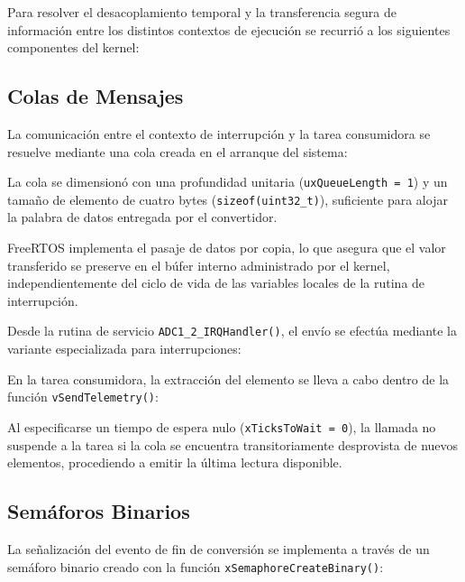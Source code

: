 Para resolver el desacoplamiento temporal y la transferencia segura de información entre los distintos contextos de
ejecución se recurrió a los siguientes componentes del kernel:

\subsection{Colas de Mensajes}

La comunicación entre el contexto de interrupción y la tarea consumidora se resuelve mediante una cola 
creada en el arranque del sistema:



La cola se dimensionó con una profundidad unitaria (\texttt{uxQueueLength = 1}) y un tamaño de elemento de cuatro bytes
(\texttt{sizeof(uint32\_t)}), suficiente para alojar la palabra de datos entregada por el convertidor.

FreeRTOS implementa el pasaje de datos por copia, lo que asegura que el valor transferido
se preserve en el búfer interno administrado por el kernel, independientemente del ciclo de vida de las variables
locales de la rutina de interrupción.

Desde la rutina de servicio \texttt{ADC1\_2\_IRQHandler()}, el envío se efectúa mediante la variante especializada
para interrupciones:



En la tarea consumidora, la extracción del elemento se lleva a cabo dentro de la función \texttt{vSendTelemetry()}:



Al especificarse un tiempo de espera nulo (\texttt{xTicksToWait = 0}), la llamada no suspende a la tarea si la cola se
encuentra transitoriamente desprovista de nuevos elementos, procediendo a emitir la última lectura disponible.

\subsection{Semáforos Binarios}

La señalización del evento de fin de conversión se implementa a través de un semáforo binario creado con la función
\texttt{xSemaphoreCreateBinary()}:

